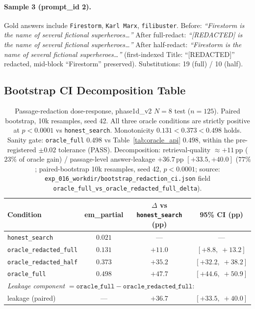 \paragraph{Sample 3 (prompt\_id 2).} Gold answers include \texttt{Firestorm}, \texttt{Karl Marx}, \texttt{filibuster}. Before: \emph{``Firestorm is the name of several fictional superheroes\ldots''} After full-redact: \emph{``[REDACTED] is the name of several fictional superheroes\ldots''} After half-redact: \emph{``Firestorm is the name of several fictional superheroes\ldots''} (first-indexed Title: ``[REDACTED]'' redacted, mid-block ``Firestorm'' preserved). Substitutions: 19 (full) / 10 (half).

\subsection{Bootstrap CI Decomposition Table}
\label{app:redaction_bootstrap}

\begin{table}[h]
\centering
\small
\begin{tabular}{lccc}
\toprule
Condition & em\_partial & $\Delta$ vs \texttt{honest\_search} (pp) & 95\% CI (pp) \\
\midrule
\texttt{honest\_search}                & $0.021$ & ---      & ---                     \\
\texttt{oracle\_redacted\_full} & $0.131$ & $+11.0$  & $[+8.8,\;+13.2]$         \\
\texttt{oracle\_redacted\_half} & $0.373$ & $+35.2$  & $[+32.2,\;+38.2]$        \\
\texttt{oracle\_full}           & $0.498$ & $+47.7$  & $[+44.6,\;+50.9]$        \\
\midrule
\multicolumn{4}{l}{\emph{Leakage component} $= \texttt{oracle\_full} - \texttt{oracle\_redacted\_full}$:} \\
\quad leakage (paired)          & ---     & $+36.7$  & $[+33.5,\;+40.0]$        \\
\bottomrule
\end{tabular}
\caption{Passage-redaction dose-response, phase1d\_v2 $N{=}8$ test ($n=125$). Paired bootstrap, 10k resamples, seed 42. All three oracle conditions are strictly positive at $p < 0.0001$ vs \texttt{honest\_search}. Monotonicity $0.131 < 0.373 < 0.498$ holds. Sanity gate: \texttt{oracle\_full} $0.498$ vs Table~\ref{tab:oracle_api} $0.498$, within the pre-registered $\pm 0.02$ tolerance (PASS). Decomposition: retrieval-quality $\approx +11$\,pp ($23\%$ of oracle gain) / passage-level answer-leakage $+36.7$\,pp $[+33.5, +40.0]$ ($77\%$; paired-bootstrap 10k resamples, seed 42, $p < 0.0001$; source: \texttt{exp\_016\_workdir/bootstrap\_redaction\_ci.json} field \texttt{oracle\_full\_vs\_oracle\_redacted\_full\_delta}).}
\label{tab:redaction_bootstrap_ci}
\end{table}

